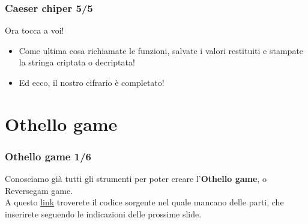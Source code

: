 \documentclass{beamer}
\begin{document}
\begin{frame}[fragile]
\frametitle{Caeser chiper 5/5}
\begin{block}{Ora tocca a voi!}
	\begin{itemize}
		\item Come ultima cosa richiamate le funzioni, salvate i valori restituiti e stampate la stringa criptata o decriptata!
		\item Ed ecco, il nostro cifrario è completato! 
	\end{itemize}
\end{block}

\end{frame}

\section{Othello game}

\begin{frame}[fragile]
\frametitle{Othello game 1/6}
Conosciamo già tutti gli strumenti per poter creare l'\textbf{Othello game}, o Reversegam game.\\
A questo \href{https://raw.githubusercontent.com/ragazzedigitalicesena/slide-2019/master/tex/chapter_14-15/reversegam.py}{link} troverete il codice sorgente nel quale mancano delle parti, che inserirete seguendo le indicazioni delle prossime slide.
\end{frame}
\end{document}
